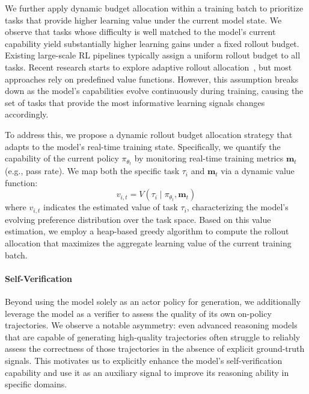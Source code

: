 \documentclass{article}
\begin{document}
We further apply dynamic budget allocation within a training batch to prioritize tasks that provide higher learning value under the current model state.
We observe that tasks whose difficulty is well matched to the model’s current capability yield substantially higher learning gains under a fixed rollout budget.
Existing large-scale RL pipelines typically assign a uniform rollout budget to all tasks.
Recent research starts to explore adaptive rollout allocation~\citep{knapsack}, but most approaches rely on predefined value functions.
However, this assumption breaks down as the model’s capabilities evolve continuously during training, causing the set of tasks that provide the most informative learning signals changes accordingly.

To address this, we propose a dynamic rollout budget allocation strategy that adapts to the model’s real-time training state.
Specifically, we quantify the capability of the current policy $\pi_{\theta_t}$ by monitoring real-time training metrics $\mathbf{m}_t$ (e.g., pass rate). 
We map both the specific task $\tau_i$ and $\mathbf{m}_t$ via a dynamic value function:
\begin{equation}
    v_{i,t} = V(\tau_i \mid \pi_{\theta_t}, \mathbf{m}_t)
\end{equation}
where $v_{i,t}$ indicates the estimated value of task $\tau_i$, characterizing the model's evolving preference distribution over the task space.
Based on this value estimation, we employ a heap-based greedy algorithm to compute the rollout allocation that maximizes the aggregate learning value of the current training batch.

\paragraph{Self-Verification}
Beyond using the model solely as an actor policy for generation, we additionally leverage the model as a verifier to assess the quality of its own on-policy trajectories.
We observe a notable asymmetry: even advanced reasoning models that are capable of generating high-quality trajectories often struggle to reliably assess the correctness of those trajectories in the absence of explicit ground-truth signals.
This motivates us to explicitly enhance the model’s self-verification capability and use it as an auxiliary signal to improve its reasoning ability in specific domains.
\end{document}

